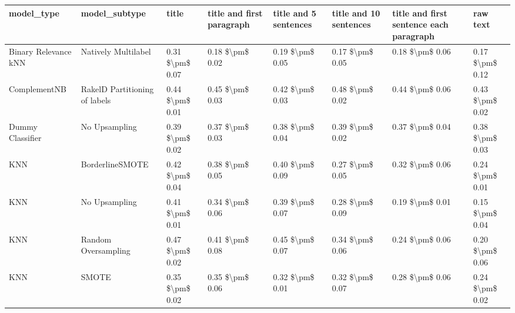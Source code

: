 \begin{tabular}{llllllll}
\toprule
                     model\_type &                 model\_subtype &           title & title and first paragraph & title and 5 sentences & title and 10 sentences & title and first sentence each paragraph &            raw text \\
\midrule
           Binary Relevance kNN &           Natively Multilabel & 0.31 \$\textbackslash pm\$ 0.07 &           0.18 \$\textbackslash pm\$ 0.02 &       0.19 \$\textbackslash pm\$ 0.05 &        0.17 \$\textbackslash pm\$ 0.05 &                         0.18 \$\textbackslash pm\$ 0.06 &     0.17 \$\textbackslash pm\$ 0.12 \\
                   ComplementNB & RakelD Partitioning of labels & 0.44 \$\textbackslash pm\$ 0.01 &           0.45 \$\textbackslash pm\$ 0.03 &       0.42 \$\textbackslash pm\$ 0.03 &        0.48 \$\textbackslash pm\$ 0.02 &                         0.44 \$\textbackslash pm\$ 0.06 &     0.43 \$\textbackslash pm\$ 0.02 \\
               Dummy Classifier &                 No Upsampling & 0.39 \$\textbackslash pm\$ 0.02 &           0.37 \$\textbackslash pm\$ 0.03 &       0.38 \$\textbackslash pm\$ 0.04 &        0.39 \$\textbackslash pm\$ 0.02 &                         0.37 \$\textbackslash pm\$ 0.04 &     0.38 \$\textbackslash pm\$ 0.03 \\
                            KNN &               BorderlineSMOTE & 0.42 \$\textbackslash pm\$ 0.04 &           0.38 \$\textbackslash pm\$ 0.05 &       0.40 \$\textbackslash pm\$ 0.09 &        0.27 \$\textbackslash pm\$ 0.05 &                         0.32 \$\textbackslash pm\$ 0.06 &     0.24 \$\textbackslash pm\$ 0.01 \\
                            KNN &                 No Upsampling & 0.41 \$\textbackslash pm\$ 0.01 &           0.34 \$\textbackslash pm\$ 0.06 &       0.39 \$\textbackslash pm\$ 0.07 &        0.28 \$\textbackslash pm\$ 0.09 &                         0.19 \$\textbackslash pm\$ 0.01 &     0.15 \$\textbackslash pm\$ 0.04 \\
                            KNN &           Random Oversampling & 0.47 \$\textbackslash pm\$ 0.02 &           0.41 \$\textbackslash pm\$ 0.08 &       0.45 \$\textbackslash pm\$ 0.07 &        0.34 \$\textbackslash pm\$ 0.06 &                         0.24 \$\textbackslash pm\$ 0.06 &     0.20 \$\textbackslash pm\$ 0.06 \\
                            KNN &                         SMOTE & 0.35 \$\textbackslash pm\$ 0.02 &           0.35 \$\textbackslash pm\$ 0.06 &       0.32 \$\textbackslash pm\$ 0.01 &        0.32 \$\textbackslash pm\$ 0.07 &                         0.28 \$\textbackslash pm\$ 0.06 &     0.24 \$\textbackslash pm\$ 0.02 \\

\end{tabular}
